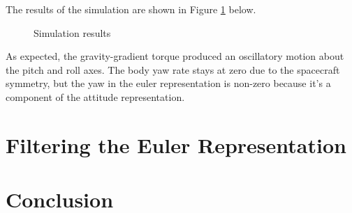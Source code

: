 \documentclass[]{aiaa-tc}%
\begin{document}
The results of the simulation are shown in Figure \ref{fig:SimResults} below.
	\begin{figure}[H]
		\centering
		\caption{Simulation results }
		\label{fig:SimResults}
	\end{figure}	

As expected, the gravity-gradient torque produced an oscillatory motion about the pitch and roll axes. The body yaw rate stays at zero due to the spacecraft symmetry, but the yaw in the euler representation is non-zero because it's a component of the attitude representation.

	\section{Filtering the Euler Representation}

	\section{Conclusion}
\end{document}
